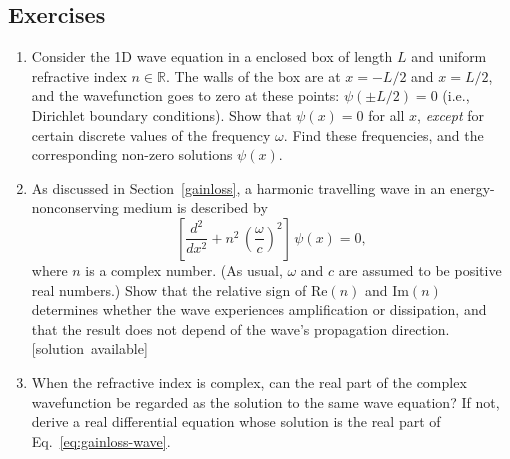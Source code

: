 \documentclass[10pt,a4paper]{article}
\begin{document}
\subsection{Exercises}
\label{exercises}

\begin{enumerate}
\item
  Consider the 1D wave equation in a enclosed box of length $L$ and
  uniform refractive index $n\in\mathbb{R}$. The walls of the box are
  at $x = -L/2$ and $x = L/2$, and the wavefunction goes to zero at
  these points: $\psi(\pm L/2) = 0$ (i.e., Dirichlet boundary
  conditions). Show that $\psi(x) = 0$ for all $x$, \emph{except}
  for certain discrete values of the frequency $\omega$. Find these
  frequencies, and the corresponding non-zero solutions $\psi(x)$.

\item
  As discussed in Section~\ref{gainloss}, a harmonic travelling wave
  in an energy-nonconserving medium is described by
  \begin{equation}
    \left[\frac{d^2}{d x^2} + n^2\, \left(\frac{\omega}{c}\right)^2\right] \, \psi(x) = 0,
  \end{equation}
  where $n$ is a complex number. (As usual, $\omega$ and $c$ are
  assumed to be positive real numbers.) Show that the relative sign of
  $\mathrm{Re}(n)$ and $\mathrm{Im}(n)$ determines whether the wave
  experiences amplification or dissipation, and that the result does
  not depend of the wave's propagation direction.
  \hfill{\scriptsize [solution~available]}

\item
  When the refractive index is complex, can the real part of the
  complex wavefunction be regarded as the solution to the same wave
  equation? If not, derive a real differential equation whose solution
  is the real part of Eq.~\eqref{eq:gainloss-wave}.
\end{enumerate}

    
\end{document}
